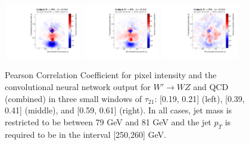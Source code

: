 \begin{figure}[h!]
  \centering
  \includegraphics[width=0.3\textwidth]{figures/corr_map_20.pdf}  \includegraphics[width=0.3\textwidth]{figures/corr_map_40.pdf}  \includegraphics[width=0.3\textwidth]{figures/corr_map_60.pdf}
  \caption{Pearson Correlation Coefficient for pixel intensity and the convolutional neural network output for $W'\rightarrow WZ$ and QCD (combined) in three small windows of $\tau_{21}$: [0.19, 0.21] (left), [0.39, 0.41] (middle), and [0.59, 0.61] (right).  In all cases, jet mass is restricted to be between 79 GeV and 81 GeV and the jet $p_T$ is required to be in the interval [250,260] GeV.}
  \label{fig:corrWindow}
\end{figure}


%





